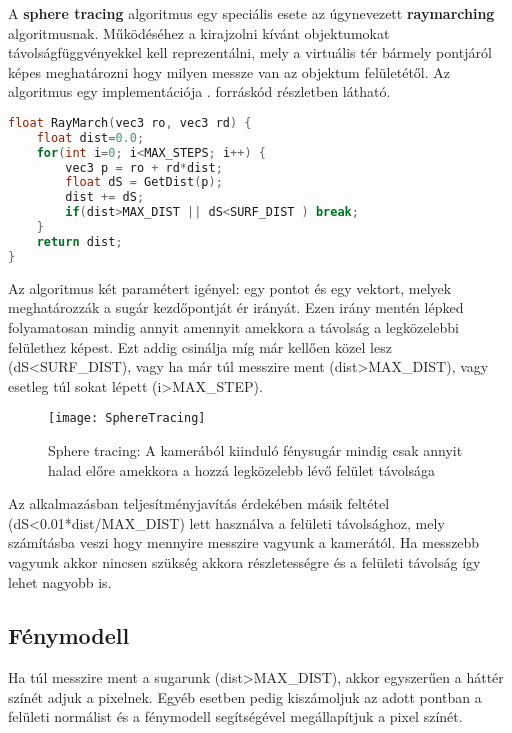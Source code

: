 A \textbf{sphere tracing} algoritmus egy speciális esete az úgynevezett \textbf{raymarching} algoritmusnak. Működéséhez a kirajzolni kívánt objektumokat távolságfüggvényekkel kell reprezentálni, mely a virtuális tér bármely pontjáról képes meghatározni hogy milyen messze van az objektum felületétől. Az algoritmus egy implementációja . forráskód részletben látható.

\begin{lstlisting}[language={C++}]
float RayMarch(vec3 ro, vec3 rd) {
	float dist=0.0;    
    for(int i=0; i<MAX_STEPS; i++) {
    	vec3 p = ro + rd*dist;
        float dS = GetDist(p);
        dist += dS;
        if(dist>MAX_DIST || dS<SURF_DIST ) break;
    }    
    return dist;
}
\end{lstlisting}

Az algoritmus két paramétert igényel: egy pontot és egy vektort, melyek meghatározzák a sugár kezdőpontját ér irányát. Ezen irány mentén lépked folyamatosan mindig annyit amennyit amekkora a távolság a legközelebbi felülethez képest. Ezt addig csinálja míg már kellően közel lesz (dS<SURF\_DIST), vagy ha már túl messzire ment (dist>MAX\_DIST), vagy esetleg túl sokat lépett (i>MAX\_STEP). 


\begin{figure}[H]
	\centering
	\texttt{[image: SphereTracing]}
	\caption{Sphere tracing: A kamerából kiinduló fénysugár mindig csak annyit halad előre amekkora a hozzá legközelebb lévő felület távolsága \cite{Raymarch94:online}}
	\label{fig:SphereTracing}
\end{figure}

Az alkalmazásban teljesítményjavítás érdekében másik feltétel (dS<0.01*dist/MAX\_DIST) lett használva a felületi távolsághoz, mely számításba veszi hogy mennyire messzire vagyunk a kamerától. Ha messzebb vagyunk akkor nincsen szükség akkora részletességre és a felületi távolság így lehet nagyobb is.

\subsection{Fénymodell}

Ha túl messzire ment a sugarunk (dist>MAX\_DIST), akkor egyszerűen a háttér színét adjuk a pixelnek. Egyéb esetben pedig kiszámoljuk az adott pontban a felületi normálist és a fénymodell segítségével megállapítjuk a pixel színét.

